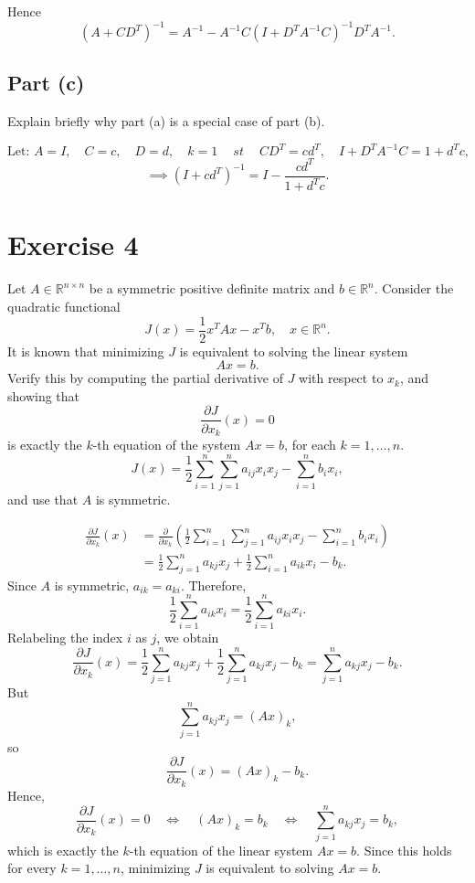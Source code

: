 Hence
\[
(A + C D^T)^{-1} = A^{-1} - A^{-1} C (I + D^T A^{-1} C)^{-1} D^T A^{-1}.
\]

\subsection*{Part (c)}
Explain briefly why part (a) is a special case of part (b).

\[
\text{Let: } A = I, \quad C = c, \quad D = d, \quad k = 1 \quad ~st~ \quad CD^T = cd^T, \quad I + D^T A^{-1}C = 1 + d^T c,
\]
\[
\implies (I + cd^T)^{-1} = I - \frac{cd^T}{1 + d^T c}.
\]

\section*{Exercise 4}

Let $A \in \mathbb{R}^{n \times n}$ be a symmetric positive definite matrix and $b \in \mathbb{R}^n$. Consider the quadratic functional
\[ J(x) = \frac{1}{2} x^T A x - x^T b, \quad x \in \mathbb{R}^n. \]
It is known that minimizing $J$ is equivalent to solving the linear system
\[ A x = b. \]
Verify this by computing the partial derivative of $J$ with respect to $x_k$, and showing that
\[ \frac{\partial J}{\partial x_k}(x) = 0 \]
is exactly the $k$-th equation of the system $A x = b$, for each $k = 1, \dots, n$.
\[ J(x) = \frac{1}{2} \sum_{i=1}^n \sum_{j=1}^n a_{ij} x_i x_j - \sum_{i=1}^n b_i x_i, \]
and use that $A$ is symmetric.

\[
\begin{aligned}
\frac{\partial J}{\partial x_k}(x)
&= \frac{\partial}{\partial x_k}\left(\frac{1}{2} \sum_{i=1}^n \sum_{j=1}^n a_{ij} x_i x_j - \sum_{i=1}^n b_i x_i\right) \\
&= \frac{1}{2} \sum_{j=1}^n a_{kj} x_j + \frac{1}{2} \sum_{i=1}^n a_{ik} x_i - b_k.
\end{aligned}
\]
Since $A$ is symmetric, $a_{ik} = a_{ki}$. Therefore,
\[
\frac{1}{2} \sum_{i=1}^n a_{ik} x_i = \frac{1}{2} \sum_{i=1}^n a_{ki} x_i.
\]
Relabeling the index $i$ as $j$, we obtain
\[
\frac{\partial J}{\partial x_k}(x)
= \frac{1}{2} \sum_{j=1}^n a_{kj} x_j + \frac{1}{2} \sum_{j=1}^n a_{kj} x_j - b_k
= \sum_{j=1}^n a_{kj} x_j - b_k.
\]
But
\[
\sum_{j=1}^n a_{kj} x_j = (Ax)_k,
\]
so
\[
\frac{\partial J}{\partial x_k}(x) = (Ax)_k - b_k.
\]
Hence,
\[
\frac{\partial J}{\partial x_k}(x) = 0
\quad \Longleftrightarrow \quad
(Ax)_k = b_k
\quad \Longleftrightarrow \quad
\sum_{j=1}^n a_{kj} x_j = b_k,
\]
which is exactly the $k$-th equation of the linear system $Ax=b$. Since this holds for every $k=1,\dots,n$, minimizing $J$ is equivalent to solving $Ax=b$.


